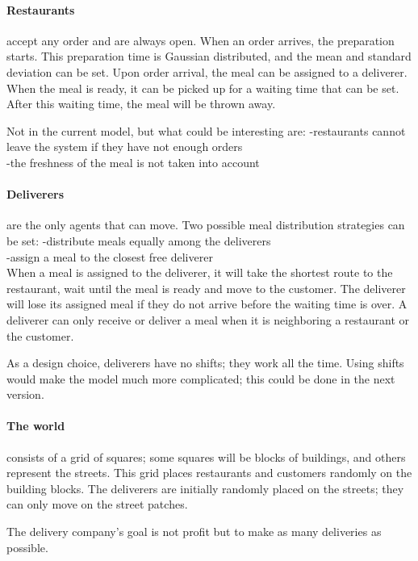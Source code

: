 \paragraph{Restaurants} accept any order and are always open.
When an order arrives, the preparation starts.
This preparation time is Gaussian distributed, and the mean and standard deviation can be set.
Upon order arrival, the meal can be assigned to a deliverer.
When the meal is ready, it can be picked up for a waiting time that can be set.
After this waiting time, the meal will be thrown away.

Not in the current model, but what could be interesting are:
-restaurants cannot leave the system if they have not enough orders\\
-the freshness of the meal is not taken into account\\

\paragraph{Deliverers} are the only agents that can move.
Two possible meal distribution strategies can be set:
-distribute meals equally among the deliverers\\
-assign a meal to the closest free deliverer\\

When a meal is assigned to the deliverer, it will take the shortest route
to the restaurant, wait until the meal is ready and move to the customer.
The deliverer will lose its assigned meal if they do not arrive before the waiting time is over.
A deliverer can only receive or deliver a meal when it is neighboring a restaurant or the customer.

As a design choice, deliverers have no shifts; they work all the time.
Using shifts would make the model much more complicated; this could be done in the next version.

\paragraph{The world} consists of a grid of squares; some squares will be blocks of buildings, and others represent the streets.
This grid places restaurants and customers randomly on the building blocks.
The deliverers are initially randomly placed on the streets; they can only move on the street patches.

The delivery company's goal is not profit but to make as many deliveries as possible.

